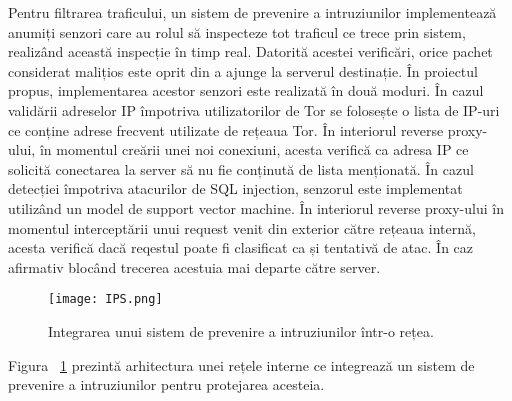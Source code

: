 Pentru filtrarea traficului, un sistem de prevenire a intruziunilor implementează anumiți senzori care au rolul să inspecteze tot traficul ce trece prin sistem, realizând această inspecție în timp real. Datorită acestei verificări, orice pachet considerat malițios este oprit din a ajunge la serverul destinație. În proiectul propus, implementarea acestor senzori este realizată în două moduri. În cazul validării adreselor IP împotriva utilizatorilor de Tor se folosește o lista de IP-uri ce conține adrese frecvent utilizate de rețeaua Tor. În interiorul reverse proxy-ului, în momentul creării unei noi conexiuni, acesta verifică ca adresa IP ce solicită conectarea la server să nu fie conținută de lista menționată. În cazul detecției împotriva atacurilor de SQL injection, senzorul este implementat utilizând un model de support vector machine. În interiorul reverse proxy-ului în momentul interceptării unui request venit din exterior către rețeaua internă, acesta verifică dacă reqestul poate fi clasificat ca și tentativă de atac. În caz afirmativ blocând trecerea acestuia mai departe către server. 
\begin{figure}[h]
	\centering
	\texttt{[image: IPS.png]}
	\caption{ Integrarea unui sistem de prevenire a intruziunilor într-o rețea. }
	\label{fig:ips-2nd-example}
\end{figure}

Figura ~\ref{fig:ips-2nd-example} prezintă arhitectura unei rețele interne ce integrează un sistem de prevenire a intruziunilor pentru protejarea acesteia.  \\

